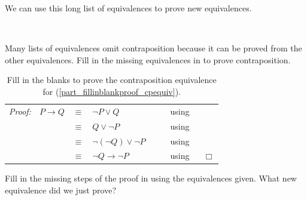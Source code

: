 We can use this long list of equivalences to prove new equivalences.

\begin{act}
\label{act_proof_logical_equiv}
~
    \begin{actpart}
        \item \label{part_fillinblankproof_cpequiv} Many lists of equivalences omit contraposition because it can be proved from the other equivalences. Fill in the missing equivalences in  to prove contraposition.

        \begin{table}[hbtp]
            \centering
            \begin{tabular}{lrclll}
                 \emph{Proof:} & $ P \to Q$ & $\equiv$ & $\neg P \lor Q$ & ~\hspace{.25in}~& using   \underline{\hspace{1in}}  \\ 
                 & & $\equiv$ & $Q \lor \neg P$ && using   \underline{\hspace{1in}}  \\ 
                 & & $\equiv$ & $\neg (\neg Q) \lor \neg P$ && using   \underline{\hspace{1in}}  \\ 
                 & & $\equiv$ & $\neg Q \to \neg P$ && using   \underline{\hspace{1in}} ~ \hfill ~$\Box$ \\ 
            \end{tabular}
            \caption{Fill in the blanks to prove the contraposition equivalence for  (\ref{part_fillinblankproof_cpequiv}).}
            \label{tab_fillinblankproof_cpequiv}
        \end{table}

        \item \label{part_fillinblanksproof_ifthenand} Fill in the missing steps of the proof in  using the equivalences given.  What new equivalence did we just prove?


\end{actpart}
\end{act}
